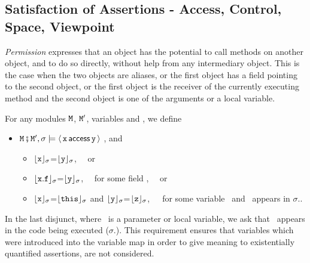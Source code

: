 \subsection{Satisfaction of Assertions - Access, Control, Space, Viewpoint}
\label{sect:pcsv} 

\textit{Permission} expresses that an object has the potential to call
methods on another object, and to do so directly, without  help from any
intermediary object. This is the case when the two objects are aliases, 
or the first object has a field pointing to the second object, or
the first object is the receiver of the currently executing method and the second object is one of the 
arguments or a local variable. 


\begin{definition}[%
Permission]  \label{def:valid:assertion:access}
For any modules ${\mbox{\tt{\ensuremath{{\mbox{\tt{M}}}}}}}$, ${\mbox{\tt{\ensuremath{{\mbox{\tt{M}}}}}}}'$,  variables  and , we define
\begin{itemize}
\item
${\mbox{\tt{\ensuremath{{\mbox{\tt{M}}}}}}}\fatsemi {\mbox{\tt{\ensuremath{{\mbox{\tt{M}}}}}}}', \sigma \models  \langle\, {\mbox{\tt{x}}}\, \mathsf{access}\, {\mbox{\tt{y}}}\, \rangle$   \IFF  {}, and \begin{itemize}
\item
${\lfloor{ {{\mbox{\tt{x}}}}}\rfloor_{\sigma}}$=${\lfloor{ {{\mbox{\tt{y}}}}}\rfloor_{\sigma}}$, \ \ or
\item
${\lfloor{ {{\mbox{\tt{x}}}.{\mbox{\tt{f}}}}}\rfloor_{\sigma}}$=${\lfloor{ {{\mbox{\tt{y}}}}}\rfloor_{\sigma}}$, \  \ for some field ,  \ \ or
\item
${\lfloor{ {{\mbox{\tt{x}}}}}\rfloor_{\sigma}}$=${\lfloor{ {{\mbox{\tt{this}}}}}\rfloor_{\sigma}}$ and
  ${\lfloor{ {{\mbox{\tt{y}}}}}\rfloor_{\sigma}}$=${\lfloor{ {{{\mbox{\tt{z}}}}}}\rfloor_{\sigma}}$,\ \ \ 
for some variable \z\ and  \z\ appears in  $\sigma$..
 \end{itemize}
\end{itemize}
\end{definition}

\noindent 
In the last disjunct, where \z\ is a parameter or local variable,
we  ask that   \z\ appears in the code being executed ($\sigma$.).
This requirement %
ensures that variables which were introduced into the variable map 
in order to give meaning to existentially quantified assertions, are not considered.


